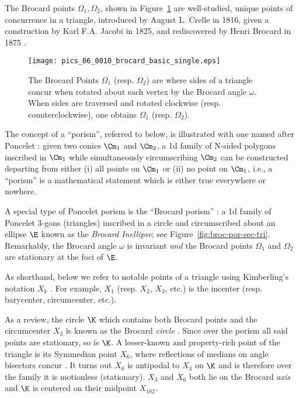The Brocard points $\Omega_1,\Omega_2$, shown in Figure~\ref{fig:brocard-basic} are well-studied, unique points of concurrence in a triangle, introduced by August L. Crelle in 1816, given a construction by Karl F.A. Jacobi in 1825, and rediscovered by Henri Brocard in 1875 \cite[Brocard Points]{mw}. 

\begin{figure}
    \centering
    \texttt{[image: pics\_06\_0010\_brocard\_basic\_single.eps]}
    \caption{The Brocard Points $\Omega_1$ (resp. $\Omega_2$) are where sides of a triangle concur when rotated about each vertex by the Brocard angle $\omega$. When sides are traversed and rotated clockwise (resp. counterclockwise), one obtains $\Omega_1$ (resp. $\Omega_2$).}
    \label{fig:brocard-basic}
\end{figure}

The concept of a ``porism'', referred to below, is illustrated with one named after Poncelet  \cite{dragovic11}: given two conics $\Cm_1$ and $\Cm_2$, a 1d family of N-sided polygons inscribed in $\Cm_1$ while simultaneously circumscribing $\Cm_2$ can be constructed departing from either (i) all points on $\Cm_1$ or (ii) no point on $\Cm_1$, i.e., a ``porism'' is a mathematical statement which is either true everywhere or nowhere.

A special type of Poncelet porism is the ``Brocard porism'' \cite{bradley2007-brocard}: a 1d family of Poncelet 3-gons (triangles) inscribed in a circle and circumscribed about an ellipse $\E$ known as the {\em Brocard Inellipse}; see Figure~\ref{fig:broc-por-sec-tri}. Remarkably, the Brocard angle $\omega$ is invariant {\em and} the Brocard points $\Omega_1$ and $\Omega_2$ are stationary at the foci of $\E$.

As shorthand, below we refer to notable points of a triangle using Kimberling's notation $X_k$ \cite{etc}. For example, $X_1$ (resp. $X_2$, $X_3$, etc.) is the incenter (resp. barycenter, circumcenter, etc.).

As a review, the circle $\K$ which contains both Brocard points and the circumcenter $X_3$ is known as the Brocard {\em circle} \cite{mw}. Since over the porism all said points are stationary, so is $\K$. A lesser-known and property-rich point of the triangle is its Symmedian point $X_6$, where reflections of medians on angle bisectors concur \cite{etc}. It turns out $X_6$ is antipodal to $X_3$ on $\K$ and is therefore over the family it is motionless (stationary). $X_3$ and $X_6$ both lie  on the Brocard {\em axis} and $\K$ is centered on their midpoint $X_{182}$.

